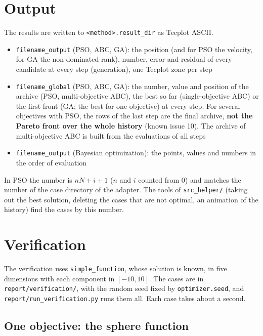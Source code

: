 \documentclass[11pt,a4paper]{article}
\begin{document}
\section{Output}\label{sec:output}

The results are written to \texttt{<method>.result\_dir} as Tecplot ASCII.

\begin{itemize}
\item \texttt{filename\_output} (PSO, ABC, GA): the position (and for PSO the velocity, for GA the non-dominated rank), number, error and residual of every candidate at every step (generation), one Tecplot zone per step
\item \texttt{filename\_global} (PSO, ABC, GA): the number, value and position of the archive (PSO, multi-objective ABC), the best so far (single-objective ABC) or the first front (GA; the best for one objective) at every step. For several objectives with PSO, the rows of the last step are the final archive, \textbf{not the Pareto front over the whole history} (known issue 10). The archive of multi-objective ABC is built from the evaluations of all steps
\item \texttt{filename\_output} (Bayesian optimization): the points, values and numbers in the order of evaluation
\end{itemize}

In PSO the number is $n N + i + 1$ ($n$ and $i$ counted from 0) and matches the number of the case directory of the adapter. The tools of \texttt{src\_helper/} (taking out the best solution, deleting the cases that are not optimal, an animation of the history) find the cases by this number.

\section{Verification}\label{sec:verification}

The verification uses \texttt{simple\_function}, whose solution is known, in five dimensions with each component in $[-10, 10]$. The cases are in \texttt{report/verification/}, with the random seed fixed by \texttt{optimizer.seed}, and \texttt{report/run\_verification.py} runs them all. Each case takes about a second.

\subsection{One objective: the sphere function}\label{sec:val-sphere}
\end{document}
